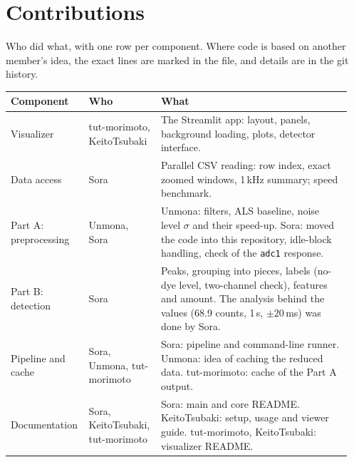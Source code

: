 \section*{Contributions}
Who did what, with one row per component. Where code is based on another member's idea, the exact
lines are marked in the file, and details are in the git history.

\begin{table}[H]
  \centering
  \small
  \begin{tabular}{@{}p{0.20\linewidth}p{0.20\linewidth}p{0.55\linewidth}@{}}
    \toprule
    Component & Who & What \\
    \midrule
    Visualizer & tut-morimoto, KeitoTsubaki & The Streamlit app: layout, panels, background
      loading, plots, detector interface. \\
    Data access & Sora & Parallel CSV reading: row index, exact zoomed windows, 1\,kHz summary;
      speed benchmark. \\
    Part A: preprocessing & Unmona, Sora & Unmona: filters, ALS baseline, noise level $\sigma$ and
      their speed-up. Sora: moved the code into this repository, idle-block handling, check of the
      \texttt{adc1} response. \\
    Part B: detection & Sora & Peaks, grouping into pieces, labels (no-dye level, two-channel
      check), features and amount. The analysis behind the values (68.9 counts, 1\,s,
      $\pm 20$\,ms) was done by Sora. \\
    Pipeline and cache & Sora, Unmona, tut-morimoto & Sora: pipeline and command-line runner.
      Unmona: idea of caching the reduced data. tut-morimoto: cache of the Part A output. \\
    Documentation & Sora, KeitoTsubaki, tut-morimoto & Sora: main and core README.
      KeitoTsubaki: setup, usage and viewer guide. tut-morimoto, KeitoTsubaki: visualizer
      README. \\
    \bottomrule
  \end{tabular}
\end{table}
